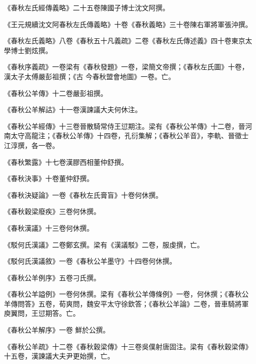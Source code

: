 \begin{pinyinscope}
 《春秋左氏經傳義略》二十五卷陳國子博士沈文阿撰。



 《王元規續沈文阿春秋左氏傳義略》十卷《春秋義略》三十卷陳右軍將軍張沖撰。



 《春秋左氏義略》八卷《春秋五十凡義疏》二卷《春秋左氏傳述義》四十卷東京太學博士劉炫撰。



 《春秋序義疏》一卷梁有《春秋發題》一卷，梁簡文帝撰；《春秋左氏圖》十卷，漢太子太傅嚴彭祖撰；《古
 今春秋盟會地圖》一卷。亡。



 《春秋公羊傳》十二卷嚴彭祖撰。



 《春秋公羊解詁》十一卷漢諫議大夫何休注。



 《春秋公羊經傳》十三卷晉散騎常侍王愆期注。梁有《春秋公羊傳》十二卷，晉河南太守高龍注；《春秋公羊傳》十四卷，孔衍集解；《春秋公羊音》，李軌、晉徵士江淳撰，各一卷。



 《春秋繁露》十七卷漢膠西相董仲舒撰。



 《春秋決事》十卷董仲舒撰。



 《春秋決疑論》一卷《春秋左氏膏盲》十卷何休撰。



 《春秋穀梁廢疾》三卷何休撰。



 《春秋漢議》十三卷何休撰。



 《駁何氏漢議》二卷鄭玄撰。梁有《漢議駁》二卷，服虔撰，亡。



 《駁何氏漢議敘》一卷《春秋公羊墨守》十四卷何休撰。



 《春秋公羊例序》五卷刁氏撰。



 《春秋公羊謚例》一卷何休撰。梁有《春秋公羊傳條例》一卷，何休撰；《春秋公羊傳問答》五卷，荀爽問，魏安平太守徐欽答；《春秋公羊論》二卷，晉車騎將軍庾翼問，王愆期答。亡。



 《春秋公羊解序》一卷
 鮮於公撰。



 《春秋公羊疏》十二卷《春秋穀梁傳》十三卷吳僕射唐固注。梁有《春秋穀梁傳》十五卷，漢諫議大夫尹更始撰，亡。




\end{pinyinscope}
